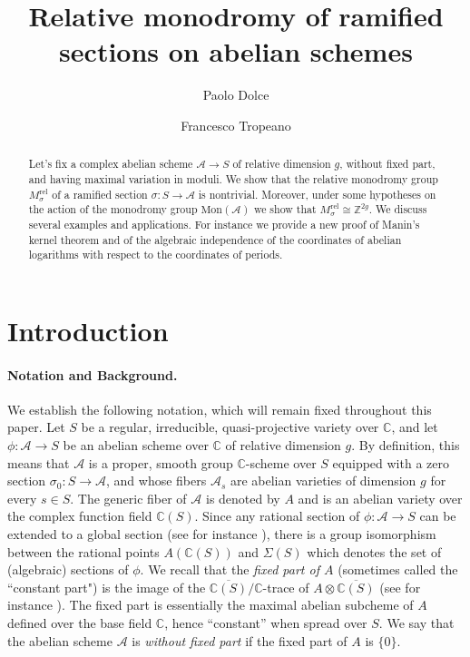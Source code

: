 \documentclass[10 pt,a4paper]{article}
\title{Relative monodromy of ramified sections on abelian schemes}
\author{Paolo Dolce \and 
Francesco Tropeano}
\date{}
\theoremstyle{plain}
\theoremstyle{definition}
\theoremstyle{named}
\newcommand{\cA}{\mathcal A}
\begin{document}
\maketitle


\makeatletter
{}
\makeatother


\begin{abstract}
    Let's fix a complex abelian scheme $\cA\to S$ of relative dimension $g$, without fixed part, and having maximal variation in moduli. We show that the relative monodromy group $M^{\textrm{rel}}_\sigma$ of a ramified section $\sigma\colon S\to\mathcal A$ is nontrivial. Moreover, under some hypotheses on the action of the monodromy group $\textrm{Mon}(\mathcal A)$ we show that $M^{\textrm{rel}}_\sigma\cong \mathbb Z^{2g}$. We discuss several examples and applications. For instance we provide a new proof of Manin's kernel theorem and of the algebraic independence of the coordinates of abelian logarithms with respect to the coordinates of periods.
\end{abstract}

\section{Introduction}
\paragraph{Notation and Background.}
We establish the following notation, which will remain fixed throughout this paper. Let \( S \) be a regular, irreducible, quasi-projective variety over \(\mathbb{C}\), and let \(\phi \colon \cA \to S\) be an abelian scheme over \(\mathbb{C}\) of relative dimension \(g\). By definition, this means that \(\cA\) is a proper, smooth group $\mathbb C$-scheme over \(S\) equipped with a zero section \(\sigma_0 \colon S \to \cA\), and whose fibers \(\mathcal{A}_s\) are abelian varieties of dimension \(g\) for every \(s \in S\). The generic fiber of $\mathcal A$ is denoted by $A$ and  is an abelian variety over the complex function field $\mathbb C(S)$. Since any rational section of $\phi\colon\mathcal A\to S$ can be extended to a global section (see for instance \cite[Proposition 6.2]{LiuLor}),  there is a group isomorphism between the rational points $A(\mathbb C(S))$ and $\Sigma(S)$ which denotes the set of (algebraic) sections of $\phi$. We recall that the \emph{fixed part of $A$} (sometimes called the ``constant part") is the image   of the $\overline{\mathbb C(S)}/\mathbb C$-trace of $A\otimes\overline{\mathbb C(S)}$ (see for instance \cite{Con}). The fixed part is essentially the maximal abelian subcheme of $A$ defined over the base field $\mathbb C$, hence ``constant'' when spread over  $S$. We say that the abelian scheme $\mathcal A$ is \emph{without fixed part} if the fixed part of $A$ is $\{0\}$.
\end{document}
